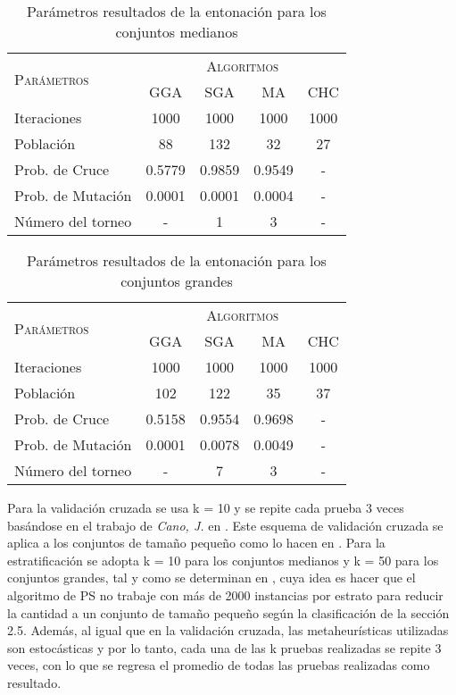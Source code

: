 \begin{table}[]
\centering
\begin{tabular}{l c c c c}
\hline
\multirow{2}{*}{\textsc{Parámetros}}
	& \multicolumn{4}{c}{\textsc{Algoritmos}} \\
	& GGA & SGA & MA & CHC \\
\hline
\hline
Iteraciones             &  1000    &  1000    &  1000      &  1000 \\
Población               &    88    &    132   &    32      &    27 \\
Prob. de Cruce          &   0.5779 &   0.9859 &     0.9549 &     - \\
Prob. de Mutación       &   0.0001 &  0.0001  &     0.0004 &     - \\
Número del torneo       &   -      &    1     &     3      &     - \\
\hline
\end{tabular}
\caption{Parámetros resultados de la entonación para los conjuntos medianos}
\label{param-med}
\end{table}

\begin{table}[]
\centering
\begin{tabular}{l c c c c}
\hline
\multirow{2}{*}{\textsc{Parámetros}}
	& \multicolumn{4}{c}{\textsc{Algoritmos}} \\
	& GGA & SGA & MA & CHC \\
\hline
\hline
Iteraciones             &  1000    &  1000    &  1000      &  1000 \\
Población               &    102   &    122   &    35      &    37 \\
Prob. de Cruce          &   0.5158 &   0.9554 &     0.9698 &     - \\
Prob. de Mutación       &   0.0001 &  0.0078  &     0.0049 &     - \\
Número del torneo       &   -      &    7     &     3      &     - \\
\hline
\end{tabular}
\caption{Parámetros resultados de la entonación para los conjuntos grandes}
\label{param-grande}
\end{table}

Para la validación cruzada se usa k = 10 y se repite cada prueba 3 veces basándose en el trabajo de \emph{Cano, J.} en \cite{de2004reduccion}. Este esquema de validación cruzada se aplica a los conjuntos de tamaño pequeño como lo hacen en \cite{de2004reduccion}. Para la estratificación se adopta k = 10 para los conjuntos medianos y k = 50 para los conjuntos grandes, tal y como se determinan en \cite{cano2005stratification}, cuya idea es hacer que el algoritmo de PS no trabaje con más de 2000 instancias por estrato para reducir la cantidad a un conjunto de tamaño pequeño según la clasificación de la sección 2.5. Además, al igual que en la validación cruzada, las metaheurísticas utilizadas son estocásticas y por lo tanto, cada una de las k pruebas realizadas se repite 3 veces, con lo que se regresa el promedio de todas las pruebas realizadas como resultado.


